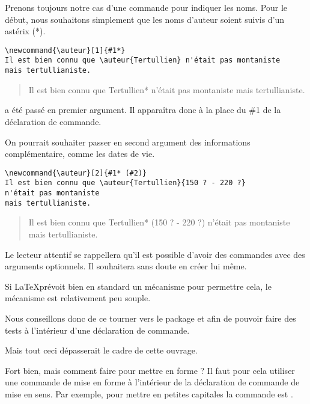 Prenons toujours notre cas d'une commande pour indiquer les noms. Pour le début, nous souhaitons simplement que les noms d'auteur soient suivis d'un astérix (*).

\begin{verbatim}
\newcommand{\auteur}[1]{#1*}
Il est bien connu que \auteur{Tertullien} n'était pas montaniste
mais tertullianiste.
\end{verbatim}

\newcommand{\auteur}[1]{#1*}

\begin{quotation}
Il est bien connu que \auteur{Tertullien} n'était pas montaniste mais tertullianiste.
\end{quotation}


 a été passé en premier argument. Il apparaîtra donc à la place du \#1 de la déclaration de commande.

On pourrait souhaiter passer en second argument des informations complémentaire, comme les dates de vie.

\begin{verbatim}
\newcommand{\auteur}[2]{#1* (#2)}
Il est bien connu que \auteur{Tertullien}{150 ? - 220 ?}
n'était pas montaniste
mais tertullianiste.
\end{verbatim}

\renewcommand{\auteur}[2]{#1* (#2)}

\begin{quotation}
Il est bien connu que \auteur{Tertullien}{150 ? - 220 ?}
n'était pas montaniste mais tertullianiste.
\end{quotation}

\begin{anedocte}
Le lecteur attentif se rappellera  qu'il est possible d'avoir des commandes avec des arguments optionnels. Il souhaitera sans doute en créer lui même.

Si \LaTeX prévoit bien en standard un mécanisme pour permettre cela, le mécanisme est relativement peu souple. 

Nous conseillons donc de ce tourner vers le package  et  afin de pouvoir faire des tests à l'intérieur d'une déclaration de commande.

Mais tout ceci dépasserait le cadre de cette ouvrage.
\end{anedocte}

Fort bien, mais comment faire pour mettre en forme ? Il faut pour cela utiliser une commande de mise en forme à l'intérieur de la déclaration de commande de mise en sens. Par exemple, pour mettre en petites capitales la commande est .

